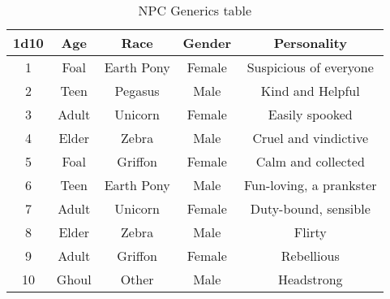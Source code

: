 \documentclass[11pt,a4paper,twocolumn]{book}
\begin{document}
    \begin{table*}[t]
        \centering
        \caption{NPC Generics table}
        \begin{tabular}{|c|c|c|c|c|}
           \hline
           \textbf{1d10}    & \textbf{Age}  & \textbf{Race}     & \textbf{Gender}   & \textbf{Personality}  \\ \hline
                    1       &      Foal     &  Earth Pony       & Female            & Suspicious of everyone \\
                    2       &       Teen    &  Pegasus          & Male              & Kind and Helpful   \\
                    3       &    Adult      &   Unicorn         & Female            & Easily spooked    \\
                    4       &   Elder       &   Zebra           & Male              & Cruel and vindictive     \\
                    5       &     Foal      &   Griffon         & Female            & Calm and collected      \\
                    6       &    Teen       &  Earth Pony       & Male              & Fun-loving, a prankster     \\
                    7       &     Adult     &  Unicorn          & Female            & Duty-bound, sensible      \\
                    8       &   Elder       &  Zebra            & Male              & Flirty      \\
                    9       &   Adult       &  Griffon          & Female            & Rebellious     \\
                    10      &   Ghoul       &  Other            & Male              & Headstrong     \\ \hline
        \end{tabular}
        \label{tab:my_label}
    \end{table*}
    
\end{document}
